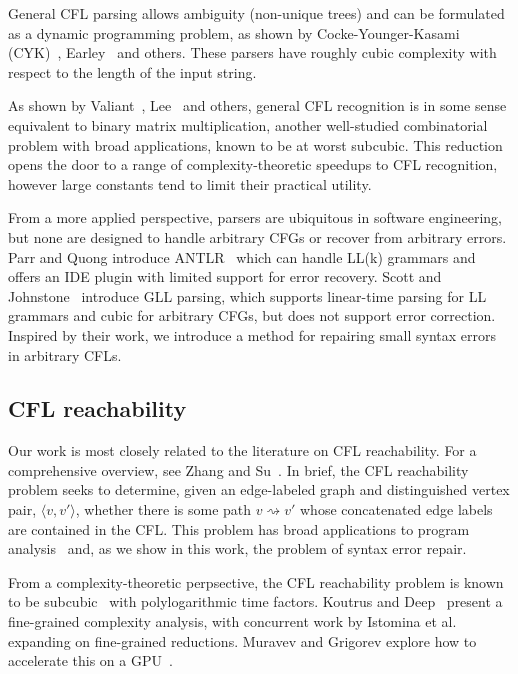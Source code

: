 \documentclass[sigplan,review,acmsmall,nonacm,screen,anonymous]{acmart}\settopmatter{printfolios=false,printccs=false,printacmref=false}
\begin{document}
General CFL parsing allows ambiguity (non-unique trees) and can be formulated as a dynamic programming problem, as shown by Cocke-Younger-Kasami (CYK)~\cite{sakai1961syntax}, Earley~\cite{earley1970efficient} and others. These parsers have roughly cubic complexity with respect to the length of the input string.

As shown by Valiant~\cite{valiant1975general}, Lee~\cite{lee2002fast} and others, general CFL recognition is in some sense equivalent to binary matrix multiplication, another well-studied combinatorial problem with broad applications, known to be at worst subcubic. This reduction opens the door to a range of complexity-theoretic speedups to CFL recognition, however large constants tend to limit their practical utility.

From a more applied perspective, parsers are ubiquitous in software engineering, but none are designed to handle arbitrary CFGs or recover from arbitrary errors. Parr and Quong introduce ANTLR~\cite{parr1995antlr} which can handle LL(k) grammars and offers an IDE plugin with limited support for error recovery. Scott and Johnstone~\cite{scott2010gll} introduce GLL parsing, which supports linear-time parsing for LL grammars and cubic for arbitrary CFGs, but does not support error correction. Inspired by their work, we introduce a method for repairing small syntax errors in arbitrary CFLs.

\subsection{CFL reachability}

Our work is most closely related to the literature on CFL reachability. For a comprehensive overview, see Zhang and Su~\cite{zhang2017context}. In brief, the CFL reachability problem seeks to determine, given an edge-labeled graph and distinguished vertex pair, $\langle v, v' \rangle$, whether there is some path $v \rightsquigarrow v'$ whose concatenated edge labels are contained in the CFL. This problem has broad applications to program analysis~\cite{kodumal2004set, reps1998program} and, as we show in this work, the problem of syntax error repair.

From a complexity-theoretic perpsective, the CFL reachability problem is known to be subcubic~\cite{chistikov2022subcubic} with polylogarithmic time factors. Koutrus and Deep~\cite{koutris2023fine} present a fine-grained complexity analysis, with concurrent work by Istomina et al.~\cite{istomina2023fine} expanding on fine-grained reductions. Muravev and Grigorev explore how to accelerate this on a GPU~\cite{muravev2025universal}.
\end{document}
